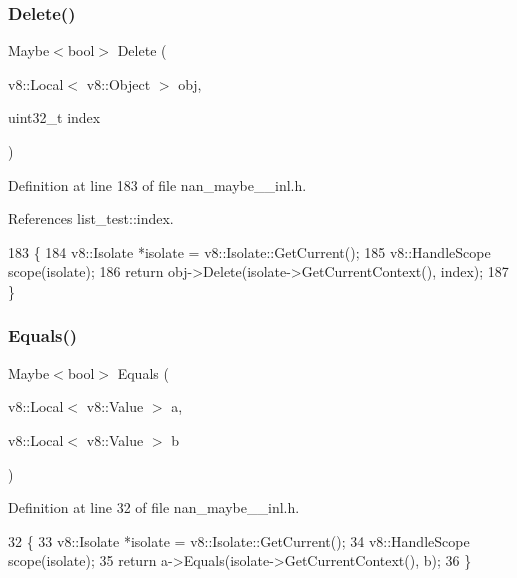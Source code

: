 \subsubsection{Delete()\hspace{0.1cm}{\footnotesize\ttfamily [2/2]}}
{\footnotesize\ttfamily Maybe$<$bool$>$ Delete (\begin{DoxyParamCaption}\item[{v8\+::\+Local$<$ v8\+::\+Object $>$}]{obj,  }\item[{uint32\+\_\+t}]{index }\end{DoxyParamCaption})}



Definition at line 183 of file nan\+\_\+maybe\+\_\+\_\+inl.\+h.



References list\+\_\+test\+::index.


\begin{DoxyCode}
183                                                           \{
184   v8::Isolate *isolate = v8::Isolate::GetCurrent();
185   v8::HandleScope scope(isolate);
186   \textcolor{keywordflow}{return} obj->Delete(isolate->GetCurrentContext(), index);
187 \}
\end{DoxyCode}
\mbox{\label{nan__maybe__43__inl_8h_ae930cf50792a60566729a55911b30c55}} 
\subsubsection{Equals()}
{\footnotesize\ttfamily Maybe$<$bool$>$ Equals (\begin{DoxyParamCaption}\item[{v8\+::\+Local$<$ v8\+::\+Value $>$}]{a,  }\item[{v8\+::\+Local$<$ v8\+::\+Value $>$}]{b }\end{DoxyParamCaption})}



Definition at line 32 of file nan\+\_\+maybe\+\_\+\_\+inl.\+h.


\begin{DoxyCode}
32                                                             \{
33   v8::Isolate *isolate = v8::Isolate::GetCurrent();
34   v8::HandleScope scope(isolate);
35   \textcolor{keywordflow}{return} a->Equals(isolate->GetCurrentContext(), b);
36 \}
\end{DoxyCode}
\mbox{\label{nan__maybe__43__inl_8h_abe0156aa640cc31ae8ea66714b03c52b}} 
